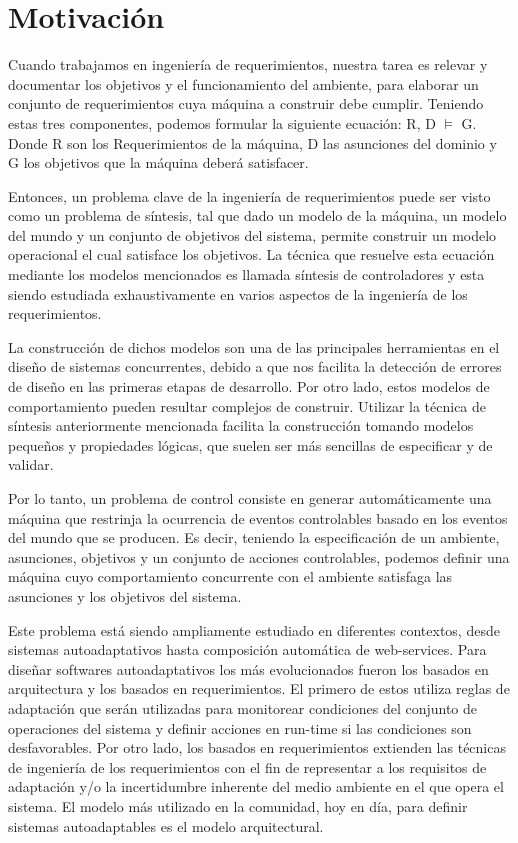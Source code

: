 \section{Motivación}

Cuando trabajamos en ingeniería de requerimientos, nuestra tarea es relevar y documentar los objetivos y el
funcionamiento del ambiente, para elaborar un conjunto de requerimientos cuya máquina a construir debe cumplir.
Teniendo estas tres componentes, podemos formular la siguiente ecuación: R, D $\vDash$ G. Donde R son los Requerimientos de la
máquina, D las asunciones del dominio y G los objetivos que la máquina deberá satisfacer.

Entonces, un problema clave de la ingeniería de requerimientos puede ser visto como un problema de síntesis, tal que
dado un modelo de la máquina, un modelo del mundo y un conjunto de objetivos del sistema, permite construir un modelo
operacional el cual satisface los objetivos. La técnica que resuelve esta ecuación mediante los modelos mencionados es
llamada síntesis de controladores y esta siendo estudiada exhaustivamente en varios aspectos de la ingeniería de los requerimientos.

La construcción de dichos modelos son una de las principales herramientas en el diseño de sistemas concurrentes, debido
a que nos facilita la detección de errores de diseño en las primeras etapas de desarrollo. Por otro lado, estos modelos
de comportamiento pueden resultar complejos de construir. Utilizar la técnica de síntesis anteriormente mencionada
facilita la construcción tomando modelos pequeños y propiedades lógicas, que suelen ser más sencillas de especificar y de validar.

Por lo tanto, un problema de control consiste en generar automáticamente una máquina que restrinja la ocurrencia de
eventos controlables basado en los eventos del mundo que se producen. Es decir, teniendo la especificación de un
ambiente, asunciones, objetivos y un conjunto de acciones controlables, podemos definir una máquina cuyo comportamiento
concurrente con el ambiente satisfaga las asunciones y los objetivos del sistema.

Este problema está siendo ampliamente estudiado en diferentes contextos, desde sistemas autoadaptativos hasta
composición automática de web-services. Para diseñar softwares autoadaptativos los más evolucionados fueron los basados
en arquitectura y los basados en requerimientos. El primero de estos utiliza reglas de adaptación que serán utilizadas
para monitorear condiciones del conjunto de operaciones del sistema y definir acciones en run-time si las condiciones
son desfavorables. Por otro lado, los basados en requerimientos extienden las técnicas de ingeniería de los
requerimientos con el fin de representar a los requisitos de adaptación y/o la incertidumbre inherente del medio
ambiente en el que opera el sistema. El modelo más utilizado en la comunidad, hoy en día, para definir sistemas
autoadaptables es el modelo arquitectural. 

